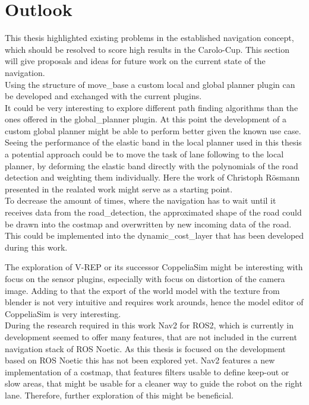 \chapter{Outlook}
\label{outlook}

This thesis highlighted existing problems in the established navigation concept, which should be resolved to score high results in the Carolo-Cup. This section will give proposals and ideas for future work on the current state of the navigation.\\

Using the structure of move\_base a custom local and global planner plugin can be developed and exchanged with the current plugins.\\

It could be very interesting to explore different path finding algorithms than the ones offered in the global\_planner plugin. At this point the development of a custom global planner might be able to perform better given the known use case.\\

Seeing the performance of the elastic band in the local planner used in this thesis a potential approach could be to move the task of lane following to the local planner, by deforming the elastic band directly with the polynomials of the road detection and weighting them individually. Here the work of Christoph Rösmann presented in the realated work might serve as a starting point.\\

To decrease the amount of times, where the navigation has to wait until it receives data from the road\_detection, the approximated shape of the road could be drawn into the costmap and overwritten by new incoming data of the road. This could be implemented into the dynamic\_cost\_layer that has been developed during this work.

The exploration of V-REP or its successor CoppeliaSim might be interesting with focus on the sensor plugins, especially with focus on distortion of the camera image. Adding to that the export of the world model with the texture from blender is not very intuitive and requires work arounds, hence the model editor of CoppeliaSim is very interesting. \\

During the research required in this work Nav2 for ROS2, which is currently in development seemed to offer many features, that are not included in the current navigation stack of ROS Noetic. As this thesis is focused on the development based on ROS Noetic this has not been explored yet. Nav2 features a new implementation of a costmap, that features filters usable to define keep-out or slow areas, that might be usable for a cleaner way to guide the robot on the right lane. Therefore, further exploration of this might be beneficial.\\


